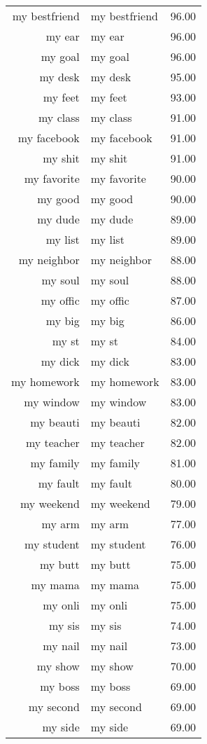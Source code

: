 \begin{table}[ht]
\begin{tabular}{rlr}
  my bestfriend & my bestfriend & 96.00 \\ 
  my ear & my ear & 96.00 \\ 
  my goal & my goal & 96.00 \\ 
  my desk & my desk & 95.00 \\ 
  my feet & my feet & 93.00 \\ 
  my class & my class & 91.00 \\ 
  my facebook & my facebook & 91.00 \\ 
  my shit & my shit & 91.00 \\ 
  my favorite & my favorite & 90.00 \\ 
  my good & my good & 90.00 \\ 
  my dude & my dude & 89.00 \\ 
  my list & my list & 89.00 \\ 
  my neighbor & my neighbor & 88.00 \\ 
  my soul & my soul & 88.00 \\ 
  my offic & my offic & 87.00 \\ 
  my big & my big & 86.00 \\ 
  my st & my st & 84.00 \\ 
  my dick & my dick & 83.00 \\ 
  my homework & my homework & 83.00 \\ 
  my window & my window & 83.00 \\ 
  my beauti & my beauti & 82.00 \\ 
  my teacher & my teacher & 82.00 \\ 
  my family & my family & 81.00 \\ 
  my fault & my fault & 80.00 \\ 
  my weekend & my weekend & 79.00 \\ 
  my arm & my arm & 77.00 \\ 
  my student & my student & 76.00 \\ 
  my butt & my butt & 75.00 \\ 
  my mama & my mama & 75.00 \\ 
  my onli & my onli & 75.00 \\ 
  my sis & my sis & 74.00 \\ 
  my nail & my nail & 73.00 \\ 
  my show & my show & 70.00 \\ 
  my boss & my boss & 69.00 \\ 
  my second & my second & 69.00 \\ 
  my side & my side & 69.00 \\ 

\end{tabular}
\end{table}
